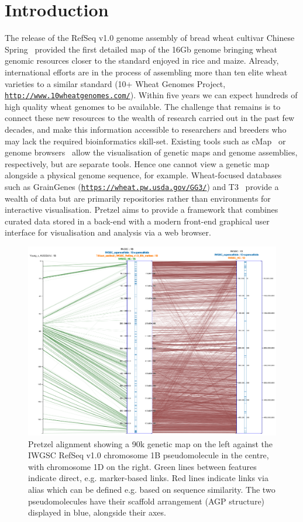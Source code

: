 
\section{Introduction}

The release of the RefSeq v1.0 genome assembly of bread wheat cultivar Chinese
Spring~\citep{IWGSC2018} provided the first detailed map of the 16Gb genome bringing wheat genomic
resources closer to the standard enjoyed in rice and maize. 
%
Already, international efforts are in the process of assembling more than ten elite wheat varieties
to a similar standard (10+ Wheat Genomes Project,
\href{http://www.10wheatgenomes.com/}{\nolinkurl{http://www.10wheatgenomes.com/}}).
%
Within five years we can expect hundreds of high quality wheat genomes to be available. 
%
The challenge that remains is to connect these new resources to the wealth of research carried out
in the past few decades, and make this information accessible to researchers and breeders who may
lack the required bioinformatics skill-set.
%
Existing tools such as cMap~\citep{fang2003cmap} or genome
browsers~\citep{Stein2013GBrowse,Buels2016JBrowse} allow the visualisation of genetic maps and genome
assemblies, respectively, but are separate tools. Hence one cannot view a genetic map alongside a
physical genome sequence, for example. 
%
Wheat-focused databases such as GrainGenes
(\href{https://wheat.pw.usda.gov/GG3/}{\nolinkurl{https://wheat.pw.usda.gov/GG3/}}) and T3~\citep{Blake2016T3} provide a wealth of data but
are primarily repositories rather than environments for interactive visualisation.
%
Pretzel aims to provide a framework that combines curated data stored in a back-end with a
modern front-end graphical user interface for visualisation and analysis via a web browser. 
%
\begin{figure}
\centering
  \includegraphics[width=\textwidth]{pretzel.png}
\caption{
  Pretzel alignment showing a 90k genetic map on the left against the IWGSC RefSeq v1.0 chromosome 1B pseudomolecule in the centre, 
  with chromosome 1D on the right. 
  Green lines between features indicate direct, e.g. marker-based links. 
  Red lines indicate links via alias which can be defined e.g. based on sequence similarity. 
  The two pseudomolecules have their scaffold arrangement (AGP structure) displayed in blue, alongside their axes.
}
\label{fig:01}
\end{figure}
